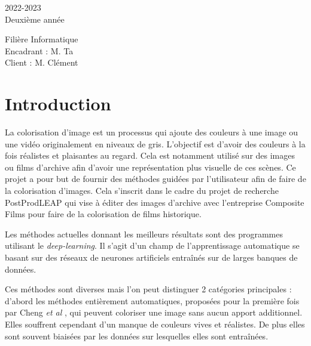 \documentclass{article}
\begin{document}
\begin{titlepage}
\begin{minipage}{0.4\textwidth}
\begin{flushleft}
        2022-2023\\
        Deuxième année\\
      \end{flushleft}
    \end{minipage}
    \begin{minipage}{0.4\textwidth}
      \begin{flushright} \large
        Filière Informatique\\
        Encadrant : M. Ta\\
        Client : M. Clément
      \end{flushright}
    \end{minipage}
    \vspace{4cm}
    \thispagestyle{empty}
\end{titlepage}

\pagebreak

\tableofcontents

\pagebreak


\section{Introduction}

La colorisation d'image est un processus qui ajoute des couleurs à une image ou une vidéo originalement en niveaux de gris.
L'objectif est d'avoir des couleurs à la fois réalistes et plaisantes au regard. 
Cela est notamment utilisé sur des images ou films d'archive afin d'avoir une représentation plus visuelle de ces scènes.
Ce projet a pour but de fournir des méthodes guidées par l’utilisateur afin de faire de la
colorisation d’images. Cela s'inscrit dans le cadre du projet de recherche PostProdLEAP qui vise à éditer des images d'archive 
avec l'entreprise Composite Films pour faire de la colorisation de films historique. 

Les méthodes actuelles donnant les meilleurs résultats sont des programmes utilisant le \emph{deep-learning}.
Il s'agit d'un champ de l'apprentissage automatique se basant sur des réseaux de neurones artificiels entraînés sur de larges banques de données.

Ces méthodes sont diverses mais l'on peut distinguer 2 catégories principales :
d'abord les méthodes entièrement automatiques, proposées pour la première fois par Cheng \emph{et al} \cite{journals/corr/ChengYS16}, qui peuvent coloriser une image sans aucun apport additionnel. 
Elles souffrent cependant d'un manque de couleurs vives et réalistes. De plus elles sont souvent biaisées par les données sur lesquelles elles sont entraînées.
\end{document}
